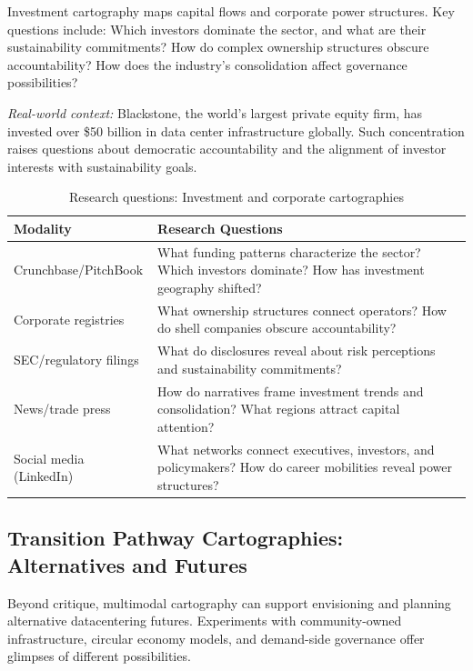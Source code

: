 \documentclass[review]{elsarticle}
\begin{document}
Investment cartography maps capital flows and corporate power structures. Key questions include: Which investors dominate the sector, and what are their sustainability commitments? How do complex ownership structures obscure accountability? How does the industry's consolidation affect governance possibilities?

\textit{Real-world context:} Blackstone, the world's largest private equity firm, has invested over \$50 billion in data center infrastructure globally. Such concentration raises questions about democratic accountability and the alignment of investor interests with sustainability goals.

\begin{table}[h]
\caption{Research questions: Investment and corporate cartographies}
\label{tab:investment}
\begin{tabular}{p{3cm}p{9cm}}
\toprule
\textbf{Modality} & \textbf{Research Questions} \\
\midrule
Crunchbase/PitchBook & What funding patterns characterize the sector? Which investors dominate? How has investment geography shifted? \\
\addlinespace
Corporate registries & What ownership structures connect operators? How do shell companies obscure accountability? \\
\addlinespace
SEC/regulatory filings & What do disclosures reveal about risk perceptions and sustainability commitments? \\
\addlinespace
News/trade press & How do narratives frame investment trends and consolidation? What regions attract capital attention? \\
\addlinespace
Social media (LinkedIn) & What networks connect executives, investors, and policymakers? How do career mobilities reveal power structures? \\
\bottomrule
\end{tabular}
\end{table}

\subsection{Transition Pathway Cartographies: Alternatives and Futures}

Beyond critique, multimodal cartography can support envisioning and planning alternative datacentering futures. Experiments with community-owned infrastructure, circular economy models, and demand-side governance offer glimpses of different possibilities.
\end{document}
